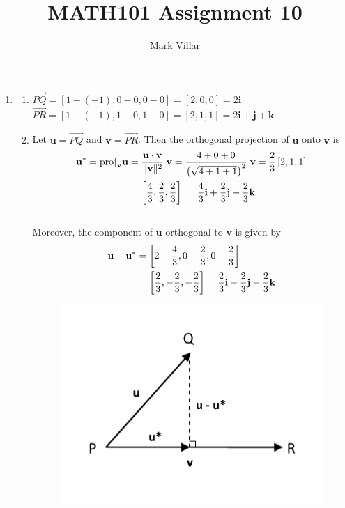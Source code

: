 \documentclass[12pt]{amsart}
\title{MATH101 Assignment 10}
\author{Mark Villar}
\begin{document}
 

\maketitle 

\begin{enumerate}
	
	\item 
	
		\begin{enumerate}
		
			\item $\vec{PQ}=[1-(-1), 0-0, 0-0] = [2, 0, 0] = 2\mathbf{i}$ \\
			
				$\vec{PR}=[1-(-1), 1-0,1-0] = [2, 1, 1] = 2\mathbf{i}+\mathbf{j}+\mathbf{k}$ \\
			\item Let $\mathbf{u}=\vec{PQ}$ and $\mathbf{v}=\vec{PR}$. Then the orthogonal projection of 				$\mathbf{u}$ onto $\mathbf{v}$ is \\
				\begin{align}
					\mathbf{u^*}=\text{proj}_{\mathbf{v}} \mathbf{u}&=
					\frac{\mathbf{u}\cdot\mathbf{v}}{\|\mathbf{v}\|^2}\hspace{0.1cm} \mathbf{v}=
					\frac{4+0+0}{\left(\sqrt{4+1+1}\right)^2}\hspace{0.1cm}\mathbf{v}=
					\frac{2}{3}\left[2,1,1\right] \notag \\
					&=\left[\frac{4}{3}, \frac{2}{3}, \frac{2}{3}\right]= \hspace{0.1cm} \frac{4}{3}\mathbf{i}+
					\frac{2}{3}\mathbf{j}+\frac{2}{3}\mathbf{k} \notag
				\end{align} \\
				Moreover, the component of $\mathbf{u}$ orthogonal to $\mathbf{v}$ is given by \\
				\begin{align}
					\mathbf{u-u^*}&=\left[2-\frac{4}{3}, 0-\frac{2}{3}, 0-\frac{2}{3} \right] \notag \\
					&=\left[\frac{2}{3}, -\frac{2}{3}, -\frac{2}{3} \right]=\frac{2}{3}\mathbf{i}-
					\frac{2}{3}\mathbf{j}-\frac{2}{3}\mathbf{k} \notag
				\end{align}
				\begin{figure}[h]
					\centering
					\includegraphics[width=4.1in]{1b.pdf}
				\end{figure}
				

\end{enumerate}
\end{enumerate}
\end{document}

